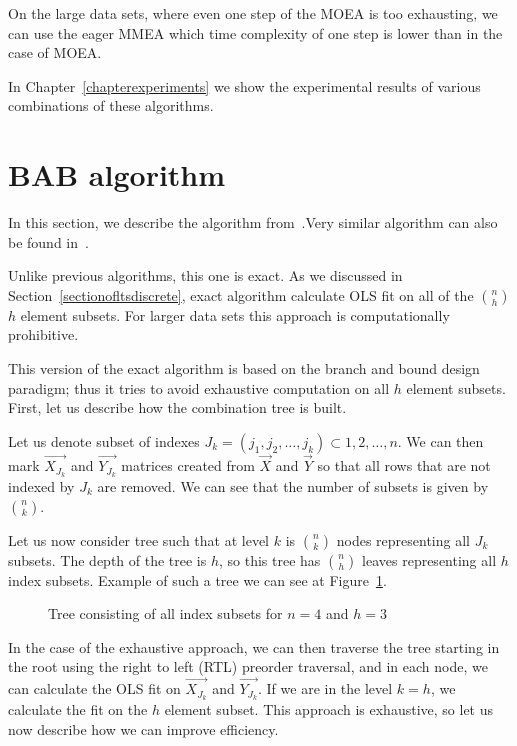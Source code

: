 On the large data sets, where even one step of the MOEA is too exhausting, we can use the eager MMEA which time complexity of one step is lower than in the case of MOEA.

In Chapter~\ref{chapterexperiments} we show the experimental results of various combinations of these algorithms.





\section{BAB algorithm} \label{sectionbab}
In this section, we describe the algorithm from~\cite{agullo2001new}.Very similar algorithm can also be found in~\cite{hofmann2010matrix}.

Unlike previous algorithms, this one is exact. As we discussed in Section~\ref{sectionofltsdiscrete}, exact algorithm calculate OLS fit on all of the $\binom{n}{h}$ $h$ element subsets. For larger data sets this approach is computationally prohibitive.

This version of the exact algorithm is based on the branch and bound design paradigm; thus it tries to avoid exhaustive computation on all $h$ element subsets. First, let us describe how the combination tree is built. 

Let us denote subset of indexes 
$J_k = (j_1, j_2, \ldots , j_k) \subset {1,2,\ldots , n}$. We can then mark
$\vec{ X_{J_k} }$ and $\vec{ Y_{J_k} }$ matrices created from $\vec{X}$
and $\vec{Y}$ so that all rows that are not indexed by $J_k$ are removed.
We can see that the number of subsets is given by $\binom{n}{k}$.

Let us now consider tree such that at level $k$ is $\binom{n}{k}$ nodes representing all $J_k$ subsets. The depth of the tree is $h$, so this tree has $\binom{n}{h}$ leaves representing all $h$ index subsets. Example of such a tree we can see at Figure~\ref{figure:full:tree}.

\begin{figure}[h]
\centering
{}
\caption{Tree consisting of all index subsets for $n=4$ and $h=3$}
\label{figure:full:tree}
\end{figure}

In the case of the exhaustive approach, we can then traverse the tree starting in the root using the right to left (RTL) preorder traversal, and in each node, we can calculate the OLS fit on $\vec{ X_{J_k} }$ and $\vec{ Y_{J_k} }$. If we are in the level $k = h$, we calculate the fit on the $h$ element subset. This approach is exhaustive, so let us now describe how we can improve efficiency. 

